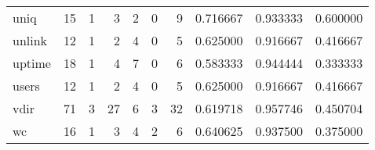 \begin{longtable}{lrrrrrrrrr}
uniq      &                                      15 &                                                  1 &                                                  3 &                                                  2 &                                                  0 &                                                  9 &                                           0.716667 &                               0.933333 &                             0.600000 \\
unlink    &                                      12 &                                                  1 &                                                  2 &                                                  4 &                                                  0 &                                                  5 &                                           0.625000 &                               0.916667 &                             0.416667 \\
uptime    &                                      18 &                                                  1 &                                                  4 &                                                  7 &                                                  0 &                                                  6 &                                           0.583333 &                               0.944444 &                             0.333333 \\
users     &                                      12 &                                                  1 &                                                  2 &                                                  4 &                                                  0 &                                                  5 &                                           0.625000 &                               0.916667 &                             0.416667 \\
vdir      &                                      71 &                                                  3 &                                                 27 &                                                  6 &                                                  3 &                                                 32 &                                           0.619718 &                               0.957746 &                             0.450704 \\
wc        &                                      16 &                                                  1 &                                                  3 &                                                  4 &                                                  2 &                                                  6 &                                           0.640625 &                               0.937500 &                             0.375000 \\

\end{longtable}
